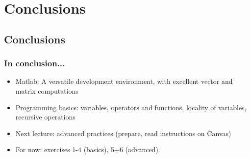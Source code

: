 \documentclass[11pt,table,final,fleqn,xcolor={usenames,dvipsnames},unknownkeysallowed,handout]{beamer}
\begin{document}
\section{Conclusions}
\subsection*{Conclusions}
\begin{frame}[fragile]
  \frametitle{In conclusion...}
  \begin{itemize}
     \item Matlab: A versatile development environment, with excellent vector and matrix computations
     \item Programming basics: variables, operators and functions, locality of variables, recursive operations
  \end{itemize}
  \pause
    \begin{itemize}
     \item Next lecture: advanced practices (prepare, read instructions on Canvas)
     \item For now: exercises 1-4 (basics), 5+6 (advanced).
  \end{itemize}
  \pause
\end{frame}
\end{document}
